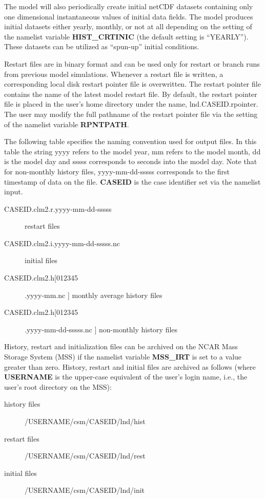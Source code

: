 The model will also periodically create initial netCDF datasets
containing only one dimensional instantaneous values of initial data
fields. The model produces initial datasets either yearly, monthly, or
not at all depending on the setting of the namelist variable {\bf
HIST\_CRTINIC} (the default setting is ``YEARLY'').  These datasets
can be utilized as ``spun-up'' initial conditions.

Restart files are in binary format and can be used only for restart or
branch runs from previous model simulations.  Whenever a restart file
is written, a corresponding local disk restart pointer file is
overwritten. The restart pointer file contains the name of the latest
model restart file. By default, the restart pointer file is placed in
the user's home directory under the name, lnd.CASEID.rpointer. The
user may modify the full pathname of the restart pointer file via
the setting of the namelist variable {\bf RPNTPATH}.

The following table specifies the naming convention used for output
files.  In this table the string yyyy refers to the model year, mm
refers to the model month, dd is the model day and sssss corresponds
to seconds into the model day. Note that for non-monthly history
files, yyyy-mm-dd-sssss corresponds to the first timestamp of data on
the file. {\bf CASEID} is the case identifier set via the namelist
input.

\begin{description}
\item [CASEID.clm2.r.yyyy-mm-dd-sssss ] restart files
\item [CASEID.clm2.i.yyyy-mm-dd-sssss.nc ] initial files
\item [CASEID.clm2.h[012345].yyyy-mm.nc ] monthly average history files
\item [CASEID.clm2.h[012345].yyyy-mm-dd-sssss.nc ] non-monthly history files 
\end{description}

History, restart and initialization files can be archived on the NCAR
Mass Storage System (MSS) if the namelist variable {\bf MSS\_IRT} is
set to a value greater than zero.  History, restart and initial files are
archived as follows (where {\bf USERNAME} is the upper-case equivalent
of the user's login name, i.e., the user's root directory on the MSS):

\begin{description} 
 \item [history files] /USERNAME/csm/CASEID/lnd/hist
 \item [restart files] /USERNAME/csm/CASEID/lnd/rest
 \item [initial files] /USERNAME/csm/CASEID/lnd/init
\end{description}
 
